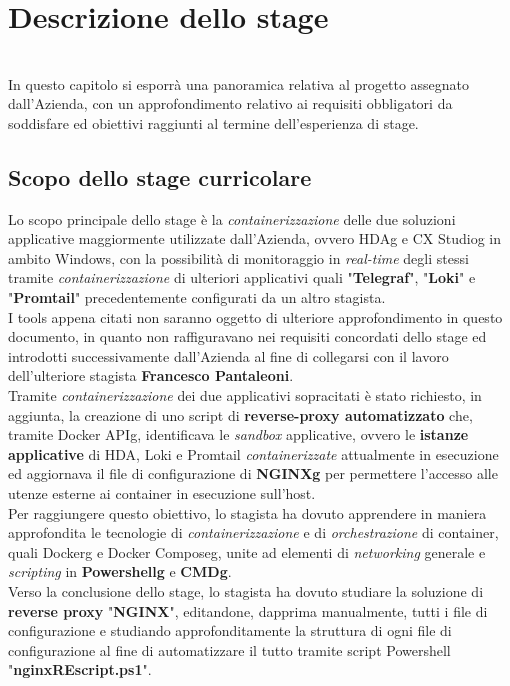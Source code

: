 
\chapter{Descrizione dello stage}
\label{cap:descrizione-stage}

\\
In questo capitolo si esporrà una panoramica relativa al progetto assegnato dall'Azienda, con un approfondimento relativo ai requisiti obbligatori da soddisfare ed obiettivi raggiunti al termine dell'esperienza di stage. 

\section{Scopo dello stage curricolare}
Lo scopo principale dello stage è la \textit{containerizzazione} delle due soluzioni applicative maggiormente utilizzate dall'Azienda, ovvero \gls{HDAg} e \gls{CX Studiog} in ambito Windows, con la possibilità di monitoraggio in \textit{real-time} degli stessi tramite \textit{containerizzazione} di ulteriori applicativi quali "\textbf{Telegraf}", "\textbf{Loki}" e "\textbf{Promtail}" precedentemente configurati da un altro stagista.\\
I tools appena citati non saranno oggetto di ulteriore approfondimento in questo documento, in quanto non raffiguravano nei requisiti concordati dello stage ed introdotti successivamente dall'Azienda al fine di collegarsi con il lavoro dell'ulteriore stagista \textbf{Francesco Pantaleoni}.\\
Tramite \textit{containerizzazione} dei due applicativi sopracitati è stato richiesto, in aggiunta, la creazione di uno script di \textbf{reverse-proxy automatizzato} che, tramite \gls{Docker APIg}, identificava le \textit{sandbox} applicative, ovvero le \textbf{istanze applicative} di HDA, Loki e Promtail \textit{containerizzate} attualmente in esecuzione ed aggiornava il file di configurazione di \textbf{\gls{NGINXg}} per permettere l'accesso alle utenze esterne ai container in esecuzione sull'host.\\
Per raggiungere questo obiettivo, lo stagista ha dovuto apprendere in maniera approfondita le tecnologie di \textit{containerizzazione} e di \textit{orchestrazione} di container, quali \gls{Dockerg} e \gls{Docker Composeg}, unite ad elementi di \textit{networking} generale e \textit{scripting} in \textbf{\gls{Powershellg}} e \textbf{\gls{CMDg}}. \\
Verso la conclusione dello stage, lo stagista ha dovuto studiare la soluzione di \textbf{reverse proxy} "\textbf{NGINX}", editandone, dapprima manualmente, tutti i file di configurazione e studiando approfonditamente la struttura di ogni file di configurazione al fine di automatizzare il tutto tramite script Powershell "\textbf{nginxREscript.ps1}".


